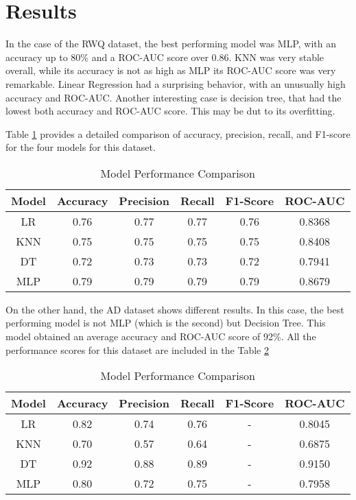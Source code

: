 \documentclass[conference]{IEEEtran}
\begin{document}
\section{Results}
In the case of the RWQ dataset, the best performing model was MLP, with an accuracy up to 80\% and a ROC-AUC score over 0.86. KNN was very stable overall, while its accuracy is not as high as MLP its ROC-AUC score was very remarkable. Linear Regression had a surprising behavior, with an unusually high accuracy and ROC-AUC. Another interesting case is decision tree, that had the lowest both accuracy and ROC-AUC score. This may be dut to its overfitting.

Table \ref{tab:model_perf_RWQ} provides a detailed comparison of accuracy, precision, recall, and F1-score for the four models for this dataset.

\begin{table}[ht]
\caption{Model Performance Comparison}
\centering
\begin{tabular}{|c|c|c|c|c|c|}
\hline
Model & Accuracy & Precision & Recall & F1-Score & ROC-AUC\\
\hline
LR & 0.76 & 0.77 & 0.77 & 0.76 & 0.8368\\
KNN & 0.75 & 0.75 & 0.75 & 0.75 & 0.8408\\
DT & 0.72 & 0.73 & 0.73 & 0.72 & 0.7941\\
MLP & 0.79 & 0.79 & 0.79 & 0.79 & 0.8679\\
\hline
\end{tabular}
\label{tab:model_perf_RWQ}
\end{table}

On the other hand, the AD dataset shows different results. In this case, the best performing model is not MLP (which is the second) but Decision Tree. This model obtained an average accuracy and ROC-AUC score of 92\%. All the performance scores for this dataset are included in the Table \ref{tab:model_perf_AD}

\begin{table}[ht]
\caption{Model Performance Comparison}
\centering
\begin{tabular}{|c|c|c|c|c|c|}
\hline
Model & Accuracy & Precision & Recall & F1-Score & ROC-AUC\\
\hline
LR & 0.82 & 0.74 & 0.76 & - & 0.8045\\
KNN & 0.70 & 0.57 & 0.64 & - & 0.6875\\
DT & 0.92 & 0.88 & 0.89 & - & 0.9150\\
MLP & 0.80 & 0.72 & 0.75 & - & 0.7958\\
\hline
\end{tabular}
\label{tab:model_perf_AD}
\end{table}
\end{document}
